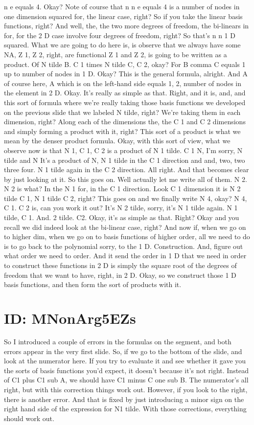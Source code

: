 \documentclass[10pt]{article}
\begin{document}
n e equals 4. Okay? Note of course that n n e equals 4 is a number of nodes in one dimension squared for, the linear case, right? So if you take the linear basis functions, right? And well, the, the two more degrees of freedom, the bi-linears in for, for the 2 D case involve four degrees of freedom, right? So that's n n 1 D squared. What we are going to do here is, is observe that we always have some NA, Z 1, Z 2, right, are functional Z 1 and Z 2, is going to be written as a product. Of N tilde B. C 1 times N tilde C, C 2, okay? For B comma C equals 1 up to number of nodes in 1 D. Okay? This is the general formula, alright. And A of course here, A which is on the left-hand side equals 1, 2, number of nodes in the element in 2 D. Okay. It's really as simple as that. Right, and it is, and, and this sort of formula where we're really taking those basis functions we developed on the previous slide that we labeled N tilde, right? We're taking them in each dimension, right? Along each of the dimensions the, the C 1 and C 2 dimensions and simply forming a product with it, right? This sort of a product is what we mean by the denser product formula. Okay, with this sort of view, what we observe now is that N 1, C 1, C 2 is a product of N 1 tilde. C 1 N, I'm sorry, N tilde and N It's a product of N, N 1 tilde in the C 1 direction and and, two, two three four. N 1 tilde again in the C 2 direction. All right. And that becomes clear by just looking at it. So this goes on. Well actually let me write all of them. N 2. N 2 is what? In the N 1 for, in the C 1 direction. Look C 1 dimension it is N 2 tilde C 1, N 1 tilde C 2, right? This goes on and we finally write N 4, okay? N 4, C 1. C 2 is, can you work it out? It's N 2 tilde, sorry, it's N 1 tilde again. N 1 tilde, C 1. And. 2 tilde. C2. Okay, it's as simple as that. Right? Okay and you recall we did indeed look at the bi-linear case, right? And now if, when we go on to higher dim, when we go on to basis functions of higher order, all we need to do is to go back to the polynomial sorry, to the 1 D. Construction. And, figure out what order we need to order. And it send the order in 1 D that we need in order to construct these functions in 2 D is simply the square root of the degrees of freedom that we want to have, right, in 2 D. Okay, so we construct those 1 D basis functions, and then form the sort of products with it.

\section*{ID: MNonArg5EZs}
So I introduced a couple of errors in the formulas on the segment, and both errors appear in the very first slide. So, if we go to the bottom of the slide, and look at the numerator here. If you try to evaluate it and see whether it gave you the sorts of basis functions you'd expect, it doesn't because it's not right. Instead of C1 plus C1 sub A, we should have C1 minus C one sub B. The numerator's all right, but with this correction things work out. However, if you look to the right, there is another error. And that is fixed by just introducing a minor sign on the right hand side of the expression for N1 tilde. With those corrections, everything should work out.
\end{document}
